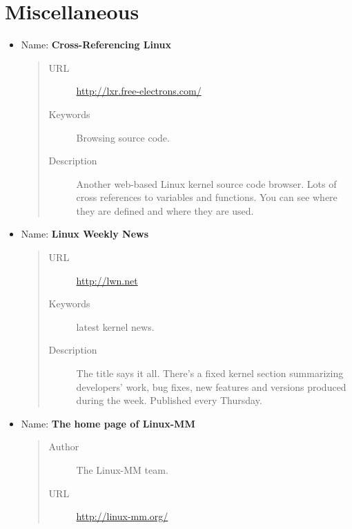 \documentclass[a4paper,8pt,english]{sphinxmanual}
\begin{document}
\section{Miscellaneous}
\label{process/kernel-docs:miscellaneous}\begin{itemize}
\item {} 
Name: \textbf{Cross-Referencing Linux}
\begin{quote}\begin{description}
\item[{URL}] \leavevmode
\href{http://lxr.free-electrons.com/}{http://lxr.free-electrons.com/}

\item[{Keywords}] \leavevmode
Browsing source code.

\item[{Description}] \leavevmode
Another web-based Linux kernel source code browser.
Lots of cross references to variables and functions. You can see
where they are defined and where they are used.

\end{description}\end{quote}

\item {} 
Name: \textbf{Linux Weekly News}
\begin{quote}\begin{description}
\item[{URL}] \leavevmode
\href{http://lwn.net}{http://lwn.net}

\item[{Keywords}] \leavevmode
latest kernel news.

\item[{Description}] \leavevmode
The title says it all. There's a fixed kernel section
summarizing developers' work, bug fixes, new features and versions
produced during the week. Published every Thursday.

\end{description}\end{quote}

\item {} 
Name: \textbf{The home page of Linux-MM}
\begin{quote}\begin{description}
\item[{Author}] \leavevmode
The Linux-MM team.

\item[{URL}] \leavevmode
\href{http://linux-mm.org/}{http://linux-mm.org/}


\end{description}
\end{quote}
\end{itemize}
\end{document}
